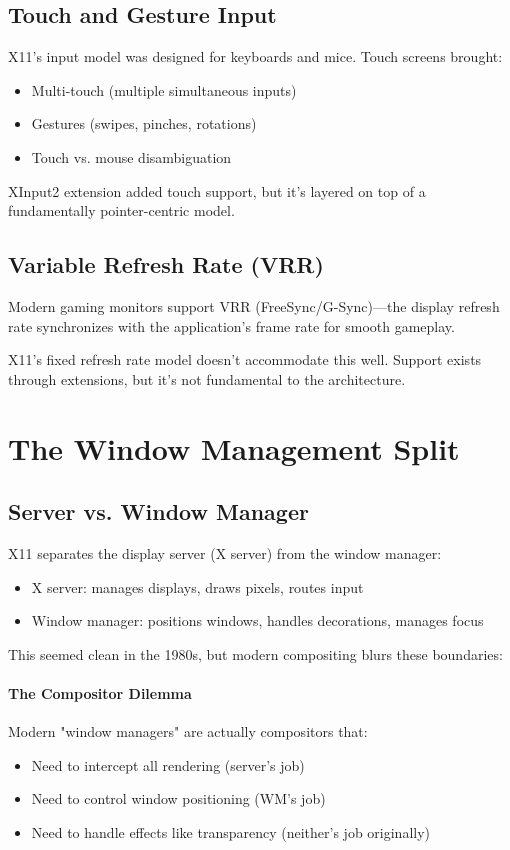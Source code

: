 \subsection{Touch and Gesture Input}

X11's input model was designed for keyboards and mice. Touch screens brought:
\begin{itemize}
    \item Multi-touch (multiple simultaneous inputs)
    \item Gestures (swipes, pinches, rotations)
    \item Touch vs. mouse disambiguation
\end{itemize}

XInput2 extension added touch support, but it's layered on top of a fundamentally pointer-centric model.

\subsection{Variable Refresh Rate (VRR)}

Modern gaming monitors support VRR (FreeSync/G-Sync)—the display refresh rate synchronizes with the application's frame rate for smooth gameplay.

X11's fixed refresh rate model doesn't accommodate this well. Support exists through extensions, but it's not fundamental to the architecture.

\section{The Window Management Split}

\subsection{Server vs. Window Manager}

X11 separates the display server (X server) from the window manager:

\begin{itemize}
    \item X server: manages displays, draws pixels, routes input
    \item Window manager: positions windows, handles decorations, manages focus
\end{itemize}

This seemed clean in the 1980s, but modern compositing blurs these boundaries:

\paragraph{The Compositor Dilemma}
Modern "window managers" are actually compositors that:
\begin{itemize}
    \item Need to intercept all rendering (server's job)
    \item Need to control window positioning (WM's job)
    \item Need to handle effects like transparency (neither's job originally)
\end{itemize}

